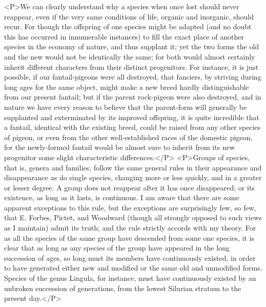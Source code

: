 <P>We can clearly understand why a species when once lost should never reappear, even if the very same conditions of life, organic and inorganic, should recur. For though the offspring of one species might be adapted (and no doubt this has occurred in innumerable instances) to fill the exact place of another species in the economy of nature, and thus supplant it; yet the two forms the old and the new would not be identically the same; for both would almost certainly inherit different characters from their distinct progenitors. For instance, it is just possible, if our fantail-pigeons were all destroyed, that fanciers, by striving during long ages for the same object, might make a new breed hardly distinguishable from our present fantail; but if the parent rock-pigeon were also destroyed, and in nature we have every reason to believe that the parent-form will generally be supplanted and exterminated by its improved offspring, it is quite incredible that a fantail, identical with the existing breed, could be raised from any other species of pigeon, or even from the other well-established races of the domestic pigeon, for the newly-formed fantail would be almost sure to inherit from its new progenitor some slight characteristic differences.</P>
<P>Groups of species, that is, genera and families, follow the same general rules in their appearance and disappearance as do single species, changing more or less quickly, and in a greater or lesser degree. A group does not reappear after it has once disappeared; or its existence, as long as it lasts, is continuous. I am aware that there are some apparent exceptions to this rule, but the exceptions are surprisingly few, so few, that E. Forbes, Pictet, and Woodward (though all strongly opposed to such views as I maintain) admit its truth; and the rule strictly accords with my theory. For as all the species of the same group have descended from some one species, it is clear that as long as any species of the group have appeared in the long succession of ages, so long must its members have continuously existed, in order to have generated either new and modified or the same old and unmodified forms. Species of the genus Lingula, for instance, must have continuously existed by an unbroken succession of generations, from the lowest Silurian stratum to the present day.</P>

